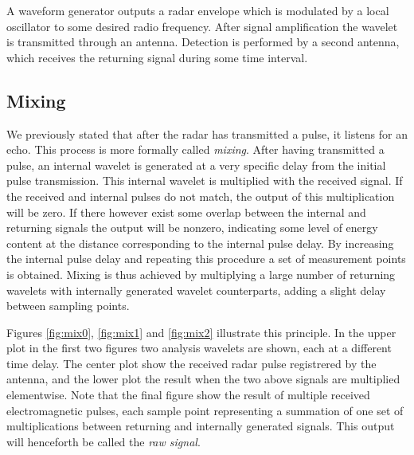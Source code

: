 

A waveform generator outputs a radar envelope which is modulated by a local oscillator to some desired radio frequency. After signal amplification the wavelet is transmitted through an antenna. Detection is performed by a second antenna, which receives the returning signal during some time interval. 

\subsection{Mixing}

We previously stated that after the radar has transmitted a pulse, it listens for an echo. This process is more formally called \textit{mixing}. After having transmitted a pulse, an internal wavelet is generated at a very specific delay from the initial pulse transmission. This internal wavelet is multiplied with the received signal. If the received and internal pulses do not match, the output of this multiplication will be zero. If there however exist some overlap between the internal and returning signals the output will be nonzero, indicating some level of energy content at the distance corresponding to the internal pulse delay. By increasing the internal pulse delay and repeating this procedure a set of measurement points is obtained. Mixing is thus achieved by multiplying a large number of returning wavelets with internally generated wavelet counterparts, adding a slight delay between sampling points. 


Figures \ref{fig:mix0}, \ref{fig:mix1} and \ref{fig:mix2} illustrate this principle. In the upper plot in the first two figures two analysis wavelets are shown, each at a different time delay. The center plot show the received radar pulse registrered by the antenna, and the lower plot the result when the two above signals are multiplied elementwise. Note that the final figure show the result of multiple received electromagnetic pulses, each sample point representing a summation of one set of multiplications between returning and internally generated signals. This output will henceforth be called the \emph{raw signal}.   

